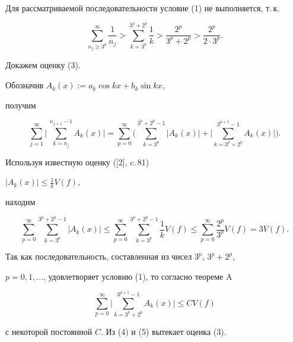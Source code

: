 \begin{pf}


Для рассматриваемой последовательности условие (1) не выполняется, т.\,к.


$$


\sum_{n_j \ge 3^p}^{\infty} \frac{1}{n_j} > \sum_{k = 3^p}^{3^p + 2^p}


\frac{1}{k} > \frac{2^p}{3^p + 2^p} > \frac{2^p}{2 \cdot 3^p}.


$$


Докажем оценку (3).


Обозначив $A_k (x) :=  a_k \cos kx + b_k \sin kx$,


получим


$$


\sum_{j = 1}^{\infty} \bigg | \, \sum_{k = n_j}^{n_{j + 1} - 1}


A_k (x) \bigg |


= \sum_{p = 0}^{\infty} \bigg ( \sum_{k = 3^p}^{3^p + 2^p - 1}


| A_k (x) | + \bigg | \sum_{k = 3^p + 2^p}^{3^{p + 1} - 1} A_k (x)


\bigg | \bigg ).


$$


Используя известную оценку ([2], c.\,81)


$| A_k (x) | \le \frac{1}{k} V(f)$,


находим


\begin{equation}


\sum_{p = 0}^{\infty} \sum_{k = 3^p}^{3^p + 2^p - 1} | A_k (x) | \le


\sum_{p = 0}^{\infty} \sum_{k = 3^p}^{3^p + 2^p - 1} \frac{1}{k} V(f) \le


\sum_{p = 0}^{\infty} \frac{2^p}{3^p} V(f) = 3 V(f).


\end{equation}


Так как последовательность, составленная из чисел $3^p$, $3^p + 2^p$,


$p = 0, 1, \dotsc$, удовлетворяет условию (1), то согласно теореме A


\begin{equation}


\sum_{p = 0}^{\infty} \bigg | \sum_{k = 3^p + 2^p}^{3^{p + 1} - 1} A_k (x)


\bigg | \le C V(f)


\end{equation}


с некоторой постоянной $C$. Из (4) и (5) вытекает оценка (3).


\end{pf}





